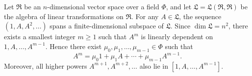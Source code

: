 Let $\mathfrak{R}$ be an $n$-dimensional vector space over a field $\Phi$, and let $\mathfrak{L} = \mathfrak{L}(\mathfrak{R}, \mathfrak{R})$ be the algebra of linear transformations on $\mathfrak{R}$. For any $A \in \mathfrak{L}$, the sequence $(1, A, A^2, \ldots)$ spans a finite-dimensional subspace of $\mathfrak{L}$. Since $\dim \mathfrak{L} = n^2$, there exists a smallest integer $m \geq 1$ such that $A^m$ is linearly dependent on $1, A, \ldots, A^{m-1}$. Hence there exist $\mu_0, \mu_1, \ldots, \mu_{m-1} \in \Phi$ such that
$$A^m = \mu_0 1 + \mu_1 A + \cdots + \mu_{m-1} A^{m-1}.$$
Moreover, all higher powers $A^{m+1}, A^{m+2}, \ldots$ also lie in $[1, A, \ldots, A^{m-1}]$.
